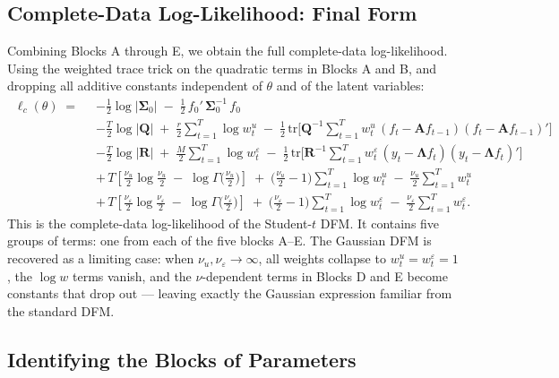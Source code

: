 \documentclass[11pt, a4paper, oneside]{article}
\newcommand{\mL}{\boldsymbol{\Lambda}}
\newcommand{\mA}{\mathbf{A}}
\newcommand{\mR}{\mathbf{R}}
\newcommand{\mQ}{\mathbf{Q}}
\begin{document}
\subsection{Complete-Data Log-Likelihood: Final Form}

Combining Blocks A through E, we obtain the full complete-data
log-likelihood. Using the weighted trace trick on the quadratic terms
in Blocks A and B, and dropping all additive constants independent of
$\theta$ and of the latent variables:
\begin{equation}
\boxed{\,
\begin{aligned}
\ell_c(\theta) \;=\;\;
&-\tfrac{1}{2}\log|\boldsymbol{\Sigma}_0| \;-\; \tfrac{1}{2}\,f_0'\,\boldsymbol{\Sigma}_0^{-1}\,f_0 \\[3pt]
&-\tfrac{T}{2}\log|\mQ|
\;+\; \tfrac{r}{2}\sum_{t=1}^{T} \log w^u_t
\;-\; \tfrac{1}{2}\,\mathrm{tr}\!\Bigg[\mQ^{-1}\sum_{t=1}^{T} w^u_t\, (f_t - \mA f_{t-1})(f_t - \mA f_{t-1})'\Bigg] \\[3pt]
&-\tfrac{T}{2}\log|\mR|
\;+\; \tfrac{M}{2}\sum_{t=1}^{T} \log w^\varepsilon_t
\;-\; \tfrac{1}{2}\,\mathrm{tr}\!\Bigg[\mR^{-1}\sum_{t=1}^{T} w^\varepsilon_t\, (y_t - \mL f_t)(y_t - \mL f_t)'\Bigg] \\[3pt]
&+\, T \left[\tfrac{\nu_u}{2}\log\!\tfrac{\nu_u}{2} \;-\; \log \Gamma\!\big(\tfrac{\nu_u}{2}\big)\right]
\;+\; \big(\tfrac{\nu_u}{2} - 1\big)\sum_{t=1}^{T}\log w^u_t
\;-\; \tfrac{\nu_u}{2}\sum_{t=1}^{T} w^u_t \\[3pt]
&+\, T \left[\tfrac{\nu_\varepsilon}{2}\log\!\tfrac{\nu_\varepsilon}{2} \;-\; \log \Gamma\!\big(\tfrac{\nu_\varepsilon}{2}\big)\right]
\;+\; \big(\tfrac{\nu_\varepsilon}{2} - 1\big)\sum_{t=1}^{T}\log w^\varepsilon_t
\;-\; \tfrac{\nu_\varepsilon}{2}\sum_{t=1}^{T} w^\varepsilon_t.
\end{aligned}
\,}
\label{eq:complete-loglik-final}
\end{equation}
This is the complete-data log-likelihood of the Student-$t$ DFM. It
contains five groups of terms: one from each of the five blocks A–E.
The Gaussian DFM is recovered as a limiting case: when
$\nu_u, \nu_\varepsilon \to \infty$, all weights collapse to
$w^u_t = w^\varepsilon_t = 1$, the
$\log w$ terms vanish, and the $\nu$-dependent terms in Blocks D and E
become constants that drop out — leaving exactly the Gaussian expression
familiar from the standard DFM.


\subsection{Identifying the Blocks of Parameters}
\end{document}
